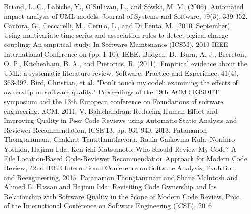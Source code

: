 \documentclass[submit,ses,noauthor]{ipsj} %
\begin{document}
\begin{thebibliography}{10}
Briand, L. C., Labiche, Y., O’Sullivan, L., and Sówka, M. M. (2006). Automated impact analysis of UML models. Journal of Systems and Software, 79(3), 339-352.
 Canfora, G., Ceccarelli, M., Cerulo, L., and Di Penta, M. (2010, September). Using multivariate time series and association rules to detect logical change coupling: An empirical study. In Software Maintenance (ICSM), 2010 IEEE International Conference on (pp. 1-10). IEEE.
Budgen, D., Burn, A. J., Brereton, O. P., Kitchenham, B. A., and Pretorius, R. (2011). Empirical evidence about the UML: a systematic literature review. Software: Practice and Experience, 41(4), 363-392.
Bird, Christian, et al. "Don't touch my code!: examining the effects of ownership on software quality." Proceedings of the 19th ACM SIGSOFT symposium and the 13th European conference on Foundations of software engineering. ACM, 2011.
V. Balachandran: Reducing Human Effort and Improving Quality in Peer Code Reviews using Automatic Static Analysis and Reviewer Recommendation, ICSE'13, pp. 931-940, 2013.
Patanamon Thongtanunam, Chakkrit Tantithamthavorn, Raula Gaikovina Kula, Norihiro Yoshida, Hajimu Iida, Ken-ichi Matsumoto: Who Should Review My Code? A File Location-Based Code-Reviewer Recommendation Approach for Modern Code Review, 22nd IEEE International Conference on Software Analysis, Evolution, and Reengineering, 2015.
Patanamon Thongtanunam and Shane McIntosh and Ahmed E. Hassan and Hajimu Iida: Revisiting Code Ownership and Its Relationship with Software Quality in the Scope of Modern Code Review, Proc. of the International Conference on Software Engineering (ICSE), 2016
 \end{thebibliography}
\end{document}
